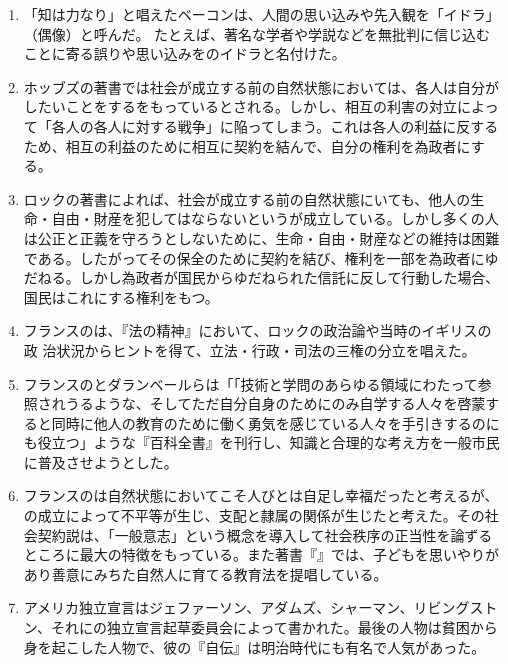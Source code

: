 \documentclass[uplatex,dvipdfmx]{jsarticle}
\begin{document}
\begin{enumerate}
\item 「知は力なり」と唱えたベーコンは、人間の思い込みや先入観を「イドラ」（偶像）と呼んだ。
たとえば、著名な学者や学説などを無批判に信じ込むことに寄る誤りや思い込みを\anaume{}のイドラと名付けた。
  

 \item ホッブズの著書\anaume{}では社会が成立する前の自然状態においては、各人は自分がしたいことをする{\anaume{}}をもっているとされる。しかし、相互の利害の対立によって「各人の各人に対する戦争」に陥ってしまう。これは各人の利益に反するため、相互の利益のために相互に契約を結んで、自分の権利を為政者に{\anaume{}}する。

 \item ロックの著書\anaume{}によれば、社会が成立する前の自然状態にいても、他人の生命・自由・財産を犯してはならないという{\anaume{}}が成立している。しかし多くの人は公正と正義を守ろうとしないために、生命・自由・財産などの維持は困難である。したがってその保全のために契約を結び、権利を一部を為政者にゆだねる。しかし為政者が国民からゆだねられた信託に反して行動した場合、国民はこれに{\anaume{}}する権利をもつ。

 \item フランスの\anaume{}は、『法の精神』において、ロックの政治論や当時のイギリスの政
   治状況からヒントを得て、立法・行政・司法の三権の分立を唱えた。

 \item フランスの\anaume{}とダランベールらは「「技術と学問のあらゆる領域にわたって参照されうるような、そしてただ自分自身のためにのみ自学する人々を啓蒙すると同時に他人の教育のために働く勇気を感じている人々を手引きするのにも役立つ」ような『百科全書』を刊行し、知識と合理的な考え方を一般市民に普及させようとした。

 \item フランスの{\anaume{}}は自然状態においてこそ人びとは自足し幸福だったと考えるが、{\anaume{}}の成立によって不平等が生じ、支配と隷属の関係が生じたと考えた。その社会契約説は、「一般意志」という概念を導入して社会秩序の正当性を論ずるところに最大の特徴をもっている。また著書『\anaume{}』では、子どもを思いやりがあり善意にみちた自然人に育てる教育法を提唱している。


 \item アメリカ独立宣言はジェファーソン、アダムズ、シャーマン、リビングストン、それに\anaume{}の独立宣言起草委員会によって書かれた。最後の人物は貧困から身を起こした人物で、彼の『自伝』は明治時代にも有名で人気があった。


\end{enumerate}
\end{document}

